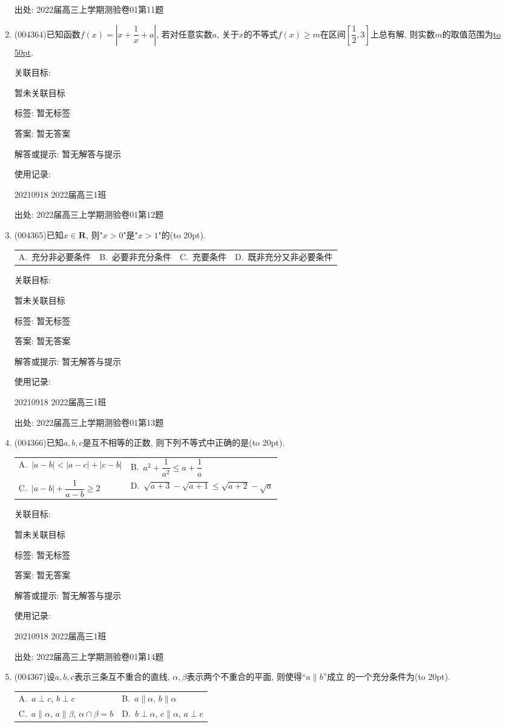 \documentclass[10pt,a4paper]{article}
\newcommand{\blank}[1]{\underline{\hbox to #1pt{}}}
\newcommand{\bracket}[1]{(\hbox to #1pt{})}
\newcommand{\twoch}[4]{\par\begin{tabular}{p{.46\textwidth}p{.46\textwidth}}
A.~#1& B.~#2\\
C.~#3& D.~#4
\end{tabular}}
\newcommand{\fourch}[4]{\par\begin{tabular}{p{.23\textwidth}p{.23\textwidth}p{.23\textwidth}p{.23\textwidth}}
A.~#1 &B.~#2& C.~#3& D.~#4
\end{tabular}}
\begin{document}
\begin{enumerate}[1.]
出处: 2022届高三上学期测验卷01第11题
\item { (004364)}已知函数$f(x)=|x+\dfrac 1x+a|$, 若对任意实数$a$, 关于$x$的不等式$f(x)\ge m$在区间$[\dfrac 12,3]$上总有解, 则实数$m$的取值范围为\blank{50}.


关联目标:

暂未关联目标



标签: 暂无标签

答案: 暂无答案

解答或提示: 暂无解答与提示

使用记录:

20210918	2022届高三1班	


出处: 2022届高三上学期测验卷01第12题
\item { (004365)}已知$x\in\mathbf{R}$, 则"$x>0$"是"$x>1$"的\bracket{20}.
\fourch{充分非必要条件}{必要非充分条件}{充要条件}{既非充分又非必要条件}


关联目标:

暂未关联目标



标签: 暂无标签

答案: 暂无答案

解答或提示: 暂无解答与提示

使用记录:

20210918	2022届高三1班	


出处: 2022届高三上学期测验卷01第13题
\item { (004366)}已知$a,b,c$是互不相等的正数, 则下列不等式中正确的是\bracket{20}.
\twoch{$|a-b|<|a-c|+|c-b|$}{$a^2+\dfrac{1}{a^2}\le a+\dfrac{1}{a}$}{$|a-b|+\dfrac{1}{a-b}\ge 2$}{$\sqrt{a+3}-\sqrt{a+1}\le\sqrt{a+2}-\sqrt a$}


关联目标:

暂未关联目标



标签: 暂无标签

答案: 暂无答案

解答或提示: 暂无解答与提示

使用记录:

20210918	2022届高三1班	


出处: 2022届高三上学期测验卷01第14题
\item { (004367)}设$a,b,c$表示三条互不重合的直线, $\alpha,\beta$表示两个不重合的平面, 则使得``$a\parallel b$''成立	的一个充分条件为\bracket{20}.
\twoch{$a\perp c$, $b\perp c$}{$a\parallel \alpha$, $b\parallel \alpha$}{$a\parallel \alpha$, $a\parallel \beta$, $\alpha \cap \beta =b$}{$b\perp \alpha$, $c\parallel \alpha$, $a\perp c$}



\end{enumerate}
\end{document}
